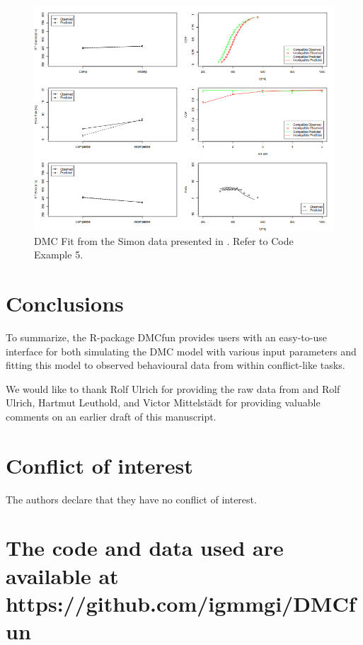 \begin{figure}[H]
    \includegraphics[width=1\textwidth]{../figures/figure6.png}
    \caption{DMC Fit from the Simon data presented in \textcite{ulrich2015automatic}. Refer to Code Example 5.}
    \label{fig:6}
\end{figure}

\section{Conclusions}
\label{summary}
To summarize, the R-package DMCfun provides users with an easy-to-use interface
for both simulating the DMC model with various input parameters and fitting
this model to observed behavioural data from within conflict-like tasks. 

\begin{acknowledgements}
    We would like to thank Rolf Ulrich for providing the raw data from
    \textcite{ulrich2015automatic} and Rolf Ulrich, Hartmut Leuthold, and Victor
    Mittelstädt for providing valuable comments on an earlier draft of this
    manuscript.
\end{acknowledgements}

\section*{Conflict of interest}
The authors declare that they have no conflict of interest.

\section*{The code and data used are available at https://github.com/igmmgi/DMCfun}

\printbibliography

